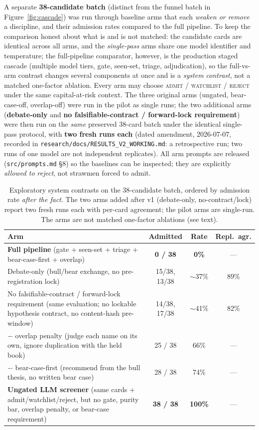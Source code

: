 \documentclass[11pt]{article}
\begin{document}
A separate \textbf{38-candidate batch} (distinct from the funnel batch in
Figure~\ref{fig:cascade}) was run through baseline arms that each \emph{weaken or
remove} a discipline, and their admission rates compared to the full pipeline. To
keep the comparison honest about what is and is not matched: the candidate cards are identical
across all arms, and the \emph{single-pass} arms share one model identifier and
temperature; the full-pipeline comparator, however, is the production staged cascade (multiple model
tiers, gate, seen-set, triage, adjudication), so the full-vs-arm contrast changes several components
at once and is a \emph{system contrast}, not a matched one-factor ablation. Every arm may choose
\textsc{admit} /
\textsc{watchlist} / \textsc{reject} under the same capital-at-risk context. The three original arms
(ungated,
bear-case-off, overlap-off) were run in the pilot as single runs; the two additional arms
(\textbf{debate-only} and \textbf{no falsifiable-contract / forward-lock requirement}) were then run
on the
\emph{same} preserved 38-card batch under the identical single-pass protocol, with \textbf{two fresh
runs each} (dated amendment, 2026-07-07, recorded in
\texttt{research/docs/RESULTS\_V2\_WORKING.md}: a retrospective run; two runs of one model are not
independent replicates). All arm prompts
are released (\texttt{src/prompts.md} §8) so the baselines can be inspected; they are
explicitly \emph{allowed to reject}, not strawmen forced to admit.

\begin{table}[h]
\centering
\begin{tabularx}{\linewidth}{@{}Lccc@{}}
\toprule
\textbf{Arm} & \textbf{Admitted} & \textbf{Rate} & \textbf{Repl.\ agr.} \\
\midrule
\textbf{Full pipeline} (gate + seen-set + triage + bear-case-first + overlap)
  & \textbf{0 / 38} & \textbf{0\%} & --- \\
Debate-only (bull/bear exchange, no pre-registration lock)
  & 15/38, 13/38 & $\sim$37\% & 89\% \\
No falsifiable-contract / forward-lock requirement (same evaluation; no lockable
  hypothesis contract, no content-hash pre-window)
  & 14/38, 17/38 & $\sim$41\% & 82\% \\
$-$ overlap penalty (judge each name on its own, ignore duplication with the
  held book)
  & 25 / 38 & 66\% & --- \\
$-$ bear-case-first (recommend from the bull thesis, no written bear case)
  & 28 / 38 & 74\% & --- \\
\textbf{Ungated LLM screener} (same cards + admit/watchlist/reject, but no gate,
  purity bar, overlap penalty, or bear-case requirement)
  & \textbf{38 / 38} & \textbf{100\%} & --- \\
\bottomrule
\end{tabularx}
\caption{Exploratory system contrasts on the 38-candidate batch, ordered by admission rate
\emph{after the fact}. The two arms added
after v1 (debate-only, no-contract/lock) report two fresh runs each with per-card
agreement; the pilot arms are single-run. The arms are not matched one-factor ablations (see text).}
\end{table}
\end{document}

